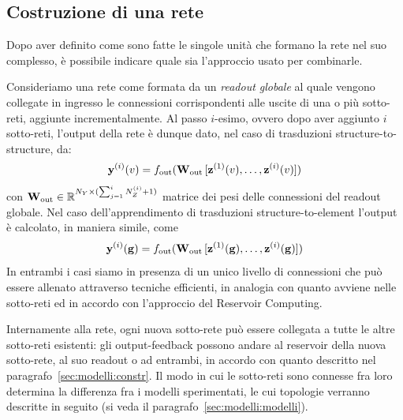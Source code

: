 \subsection{Costruzione di una rete}\label{sec:modelli:constr:costruzione}
Dopo aver definito come sono fatte le singole unità che formano la rete nel suo complesso, è possibile indicare quale sia l'approccio usato per combinarle. 

Consideriamo una rete come formata da un \emph{readout globale} al quale vengono collegate in ingresso le connessioni corrispondenti alle uscite di una o più sotto-reti, aggiunte incrementalmente. Al passo $i$-esimo, ovvero dopo aver aggiunto $i$ sotto-reti, l'output della rete è dunque dato, nel caso di trasduzioni structure-to-structure, da:
\begin{equation}\label{eq:modelli:globalreadout-str2str}
\vect{y}^{(i)}(v) = f_\textup{out}( \matr{W}_\textup{out} \, [\vect{z}^{(1)}(v), \dots, \vect{z}^{(i)}(v)] )
\end{equation}
con $\matr{W}_\textup{out} \in \R^{N_Y \times (\sum_{j=1}^{i} N_Z^{(i)} + 1)}$ matrice dei pesi delle connessioni del readout globale. Nel caso dell'apprendimento di trasduzioni structure-to-element l'output è calcolato, in maniera simile, come
\begin{equation}\label{eq:modelli:globalreadout-str2el}
\vect{y}^{(i)}(\graph{g}) = f_\textup{out}( \matr{W}_\textup{out} \, [\vect{z}^{(1)}(\graph{g}), \dots, \vect{z}^{(i)}(\graph{g})] )
\end{equation}
In entrambi i casi siamo in presenza di un unico livello di connessioni che può essere allenato attraverso tecniche efficienti, in analogia con quanto avviene nelle sotto-reti ed in accordo con l'approccio del Reservoir Computing.

Internamente alla rete, ogni nuova sotto-rete può essere collegata a tutte le altre sotto-reti esistenti: gli output-feedback possono andare al reservoir della nuova sotto-rete, al suo readout o ad entrambi, in accordo con quanto descritto nel paragrafo~\ref{sec:modelli:constr}. Il modo in cui le sotto-reti sono connesse fra loro determina la differenza fra i modelli sperimentati, le cui topologie verranno descritte in seguito (si veda il paragrafo~\vref{sec:modelli:modelli}).

